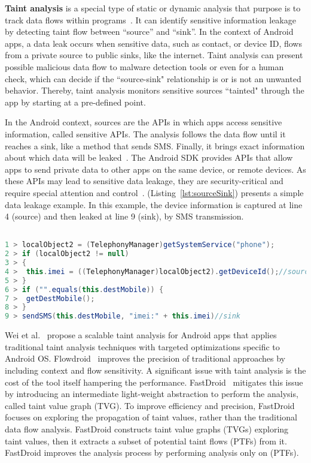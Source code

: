 \textbf{Taint analysis} is a special type of static or dynamic analysis that purpose is to track data flows within programs~\cite{DBLP:conf/sigsoft/PauckBW18}. It can identify sensitive information leakage by detecting taint flow between ``source'' and ``sink''. In the context of Android apps, a data leak occurs when sensitive data, such as contact, or device ID, flows from a private source to public sinks, like the internet. Taint analysis can present possible malicious data flow to malware detection tools or even for a human check, which can decide if the ``source-sink" relationship is or is not an unwanted behavior. Thereby, taint analysis monitors sensitive sources ``tainted" through the app by starting at a pre-defined point. 

In the Android context, sources are the APIs in which apps access sensitive information, called sensitive APIs. The analysis follows the data flow until it reaches a sink, like a method that sends SMS. Finally, it brings exact information about which data will be leaked~\cite{DBLP:conf/pldi/ArztRFBBKTOM14}. The Android SDK provides APIs that allow apps to send private data to other apps on the same device, or remote devices. As these APIs may lead to sensitive data leakage, they are security-critical and require special attention and control~\cite{DBLP:conf/osdi/EnckGCCJMS10}. (Listing~\ref{lst:sourceSink}) presents a simple data leakage example. In this example, the device information is captured at line 4 (source) and then leaked at line 9 (sink), by SMS transmission.


\begin{lstlisting}[caption={Simple Data Leakage},
      language=Java, basicstyle=\fontsize{8}{6}\selectfont\ttfamily,
      label={lst:sourceSink}]

1 > localObject2 = (TelephonyManager)getSystemService("phone");
2 > if (localObject2 != null)
3 > {
4 >  this.imei = ((TelephonyManager)localObject2).getDeviceId();//source
5 > }
6 > if ("".equals(this.destMobile)) {
7 >  getDestMobile();
8 > }
9 > sendSMS(this.destMobile, "imei:" + this.imei)//sink
\end{lstlisting}


Wei et al.~\cite{DBLP:conf/issta/HuangDMD15} propose a scalable taint analysis for Android apps that applies traditional taint analysis techniques with targeted optimizations specific to Android OS. Flowdroid~\cite{DBLP:conf/pldi/ArztRFBBKTOM14} improves the precision of traditional approaches by including context and flow sensitivity. A significant issue with taint analysis is the cost of the tool itself hampering the performance. FastDroid~\cite{DBLP:journals/compsec/ZhangTD21} mitigates this issue by introducing an intermediate light-weight abstraction to perform the analysis, called taint value graph (TVG). To improve efficiency and precision, FastDroid focuses on exploring the propagation of taint values, rather than the traditional data flow analysis. FastDroid constructs taint value graphs (TVGs) exploring taint values, then it extracts a subset of potential taint flows (PTFs) from it. FastDroid improves the analysis process by performing analysis only on (PTFs).

